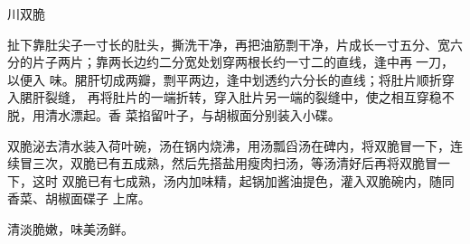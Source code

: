 \begin{recipe}{川双脆}

\ingredients


\preparation

\step 扯下靠肚尖子一寸长的肚头，撕洗干净，再把油筋剽干净，片成长一寸五分、宽六
分的片子两片；靠两长边约二分宽处划穿两根长约一寸二的直线，逢中再𠟤一刀，以便入
味。𬂁肝切成两瓣，剽平两边，逢中划透约六分长的直线；将肚片顺折穿入𬂁肝裂缝，
再将肚片的一端折转，穿入肚片另一端的裂缝中，使之相互穿稳不脱，用清水漂起。香
菜掐留叶子，与胡椒面分别装入小碟。

\step 双脆泌去清水装入荷叶碗，汤在锅内烧沸，用汤瓢舀汤在碑内，将双脆冒一下，连
续冒三次，双脆已有五成熟，然后先搭盐用瘦肉扫汤，等汤清好后再将双脆冒一下，这时
双脆已有七成熟，汤内加味精，起锅加酱油提色，灌入双脆碗内，随同香菜、胡椒面碟子
上席。

\features

清淡脆嫩，味美汤鲜。

\end{recipe}

